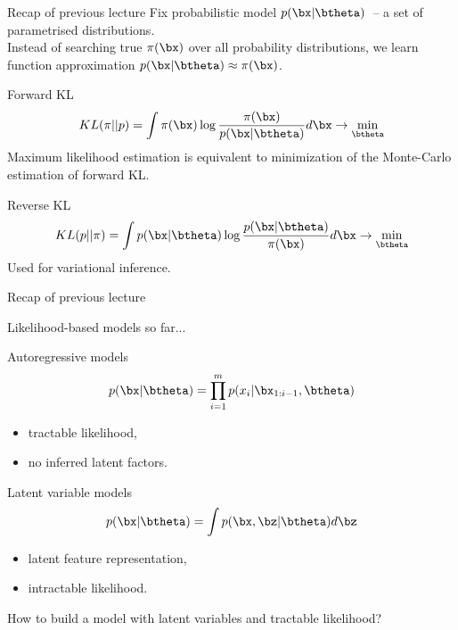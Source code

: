 

\begin{frame}
\titlepage
\end{frame}
\begin{frame}{Recap of previous lecture}
	Fix probabilistic model $p(\bx | \btheta)$~-- a set of parametrised distributions. \\
	Instead of searching true $\pi(\bx)$ over all probability distributions, we learn function approximation $p(\bx | \btheta) \approx \pi(\bx)$.
	\begin{block}{Forward KL}
		\vspace{-0.2cm}
		\[
			KL(\pi || p) = \int \pi (\bx) \log \frac{\pi(\bx)}{p(\bx | \btheta)} d \bx \rightarrow \min_{\btheta}
		\]
		Maximum likelihood estimation is equivalent to minimization of the Monte-Carlo estimation of forward KL.
	\end{block}
	\begin{block}{Reverse KL}
		\vspace{-0.2cm}
		\[
			KL(p || \pi) = \int p (\bx| \btheta) \log \frac{p(\bx| \btheta)}{\pi(\bx)} d \bx \rightarrow \min_{\btheta}
		\]
		Used for variational inference.
	\end{block}
\end{frame}
\begin{frame}{Recap of previous lecture}
	\begin{block}{Likelihood-based models so far...}
	\begin{minipage}[t]{0.5\columnwidth}
		\begin{block}{Autoregressive models}
			\vspace{-0.5cm}
			\[
			p(\bx|\btheta) = \prod_{i=1}^m p(x_i | \bx_{1:i - 1}, \btheta)
			\]
			\vspace{-0.2cm}
			\begin{itemize}
				\item tractable likelihood, 
				\item no inferred latent factors.
			\end{itemize}
		\end{block}
	\end{minipage}%
	\begin{minipage}[t]{0.5\columnwidth}
		\begin{block}{Latent variable models}
			\[
			p(\bx| \btheta) = \int p(\bx, \bz | \btheta) d \bz
			\]
			\begin{itemize}
				\item latent feature representation, 
				\item intractable likelihood.
			\end{itemize}
		\end{block}
	\end{minipage}
	\end{block}
	
	\vspace{1cm } 
	How to build a model with latent variables and tractable likelihood?
\end{frame}
